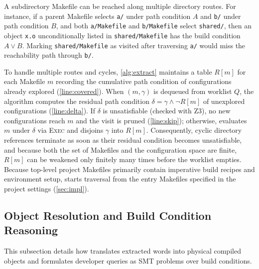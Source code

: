 \documentclass[acmsmall,screen,review,anonymous,nonacm]{acmart}
\begin{document}
  A subdirectory Makefile can be reached along multiple directory routes.
  For instance, if a parent Makefile selects \texttt{a/} under path condition $A$ and \texttt{b/} under path condition $B$, and both \texttt{a/Makefile} and \texttt{b/Makefile} select \texttt{shared/}, then an object \texttt{x.o} unconditionally listed in \texttt{shared/Makefile} has the build condition $A \lor B$.
  Marking \texttt{shared/Makefile} as visited after traversing \texttt{a/} would miss the reachability path through \texttt{b/}.

  To handle multiple routes and cycles, \autoref{alg:extract} maintains a table $R[m]$ for each Makefile $m$ recording the cumulative path condition of configurations already explored (\autoref{line:covered}).
  When $(m, \gamma)$ is dequeued from worklist $Q$, the algorithm computes the residual path condition $\delta = \gamma \land \neg R[m]$ of unexplored configurations (\autoref{line:delta}).
  If $\delta$ is unsatisfiable (checked with Z3), no new configurations reach $m$ and the visit is pruned (\autoref{line:skip}); otherwise, \tool{} evaluates $m$ under $\delta$ via \textsc{Exec} and disjoins $\gamma$ into $R[m]$.
  Consequently, cyclic directory references terminate as soon as their residual condition becomes unsatisfiable, and because both the set of Makefiles and the configuration space are finite, $R[m]$ can be weakened only finitely many times before the worklist empties.
  Because top-level project Makefiles primarily contain imperative build recipes and environment setup, \tool{} starts traversal from the entry Makefiles specified in the project settings (\autoref{sec:impl}).

  \subsection{Object Resolution and Build Condition Reasoning}\label{sec:approach:objects}
  \label{sec:approach:use}\label{sec:approach:meaning}
  This subsection details how \tool{} translates extracted words into physical compiled objects and formulates developer queries as SMT problems over build conditions.
\end{document}

